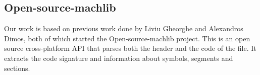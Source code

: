 \subsection{Open-source-machlib}

Our work is based on previous work \cite{open-source-machlib} done by Liviu
Gheorghe and Alexandros Dimos, both of which started the Open-source-machlib
project. This is an open source cross-platform API that parses both the
header and the code of the file. It extracts the code signature and
information about symbols, segments and sections.
